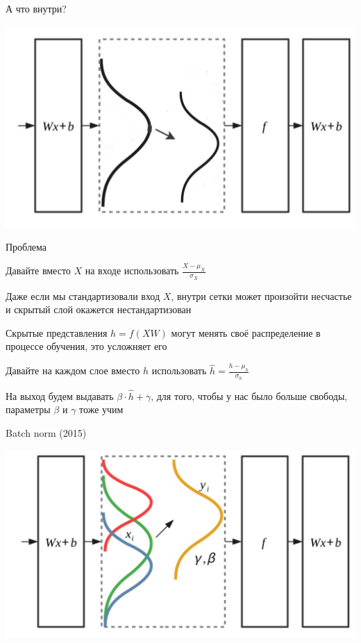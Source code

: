 \documentclass[notes,12pt, aspectratio=169]{beamer}
\newenvironment{wideitemize}{\itemize\addtolength{\itemsep}{10pt}}{\enditemize}
\begin{document}
\begin{frame}{А что внутри?}
\begin{center}
	\includegraphics[width=.7\linewidth]{distributions_2.png}
\end{center}
\end{frame}


\begin{frame}{Проблема}
\begin{wideitemize}
	\item Давайте вместо $X$ на входе использовать $\frac{X - \mu_X}{\sigma_X}$
	
	\item  Даже если мы стандартизовали вход $X$, внутри сетки может произойти несчастье и скрытый слой окажется нестандартизован 
	
	\item  Скрытые представления $h = f(XW)$  могут менять своё распределение в процессе обучения, это усложняет его  \pause
	
	\item Давайте на каждом слое вместо $h$ использовать  $\hat h = \frac{h - \mu_h}{\sigma_h}$
	
	\item На выход будем выдавать $\beta \cdot  \hat h + \gamma$, для того, чтобы у нас было больше свободы, параметры $\beta$ и $\gamma$ тоже учим 
\end{wideitemize}
\end{frame}


\begin{frame}{Batch norm (2015)}
\begin{center}
	\includegraphics[width=.7\linewidth]{distributions_nice.png}
\end{center}
\end{frame}
\end{document}
